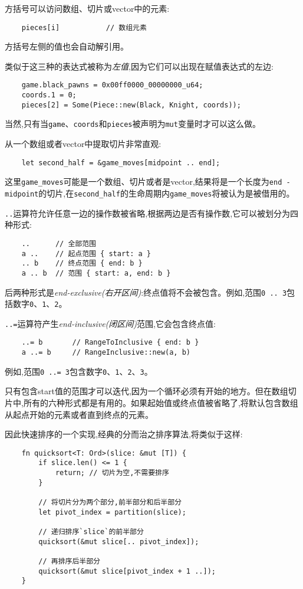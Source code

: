 方括号可以访问数组、切片或vector中的元素:
\begin{verbatim}
    pieces[i]           // 数组元素
\end{verbatim}

方括号左侧的值也会自动解引用。

类似于这三种的表达式被称为\emph{左值},因为它们可以出现在赋值表达式的左边:
\begin{verbatim}
    game.black_pawns = 0x00ff0000_00000000_u64;
    coords.1 = 0;
    pieces[2] = Some(Piece::new(Black, Knight, coords));
\end{verbatim}

当然,只有当\texttt{game}、\texttt{coords}和\texttt{pieces}被声明为\texttt{mut}变量时才可以这么做。

从一个数组或者vector中提取切片非常直观:
\begin{verbatim}
    let second_half = &game_moves[midpoint .. end];
\end{verbatim}

这里\texttt{game\_moves}可能是一个数组、切片或者是vector,结果将是一个长度为\texttt{end - midpoint}的切片,在\texttt{second\_half}的生命周期内\texttt{game\_moves}将被认为是被借用的。

\texttt{..}运算符允许任意一边的操作数被省略,根据两边是否有操作数,它可以被划分为四种形式:
\begin{verbatim}
    ..      // 全部范围
    a ..    // 起点范围 { start: a }
    .. b    // 终点范围 { end: b }
    a .. b  // 范围 { start: a, end: b }
\end{verbatim}

后两种形式是\emph{end-exclusive(右开区间)}:终点值将不会被包含。例如,范围\texttt{0 .. 3}包括数字\texttt{0}、\texttt{1}、\texttt{2}。

\texttt{..=}运算符产生\emph{end-inclusive(闭区间)}范围,它会包含终点值:
\begin{verbatim}
    ..= b       // RangeToInclusive { end: b }
    a ..= b     // RangeInclusive::new(a, b)
\end{verbatim}

例如,范围\texttt{0 ..= 3}包含数字\texttt{0}、\texttt{1}、\texttt{2}、\texttt{3}。

只有包含start值的范围才可以迭代,因为一个循环必须有开始的地方。但在数组切片中,所有的六种形式都是有用的。如果起始值或终点值被省略了,将默认包含数组从起点开始的元素或者直到终点的元素。

因此快速排序的一个实现,经典的分而治之排序算法,将类似于这样:
\begin{verbatim}
    fn quicksort<T: Ord>(slice: &mut [T]) {
        if slice.len() <= 1 {
            return; // 切片为空,不需要排序
        }

        // 将切片分为两个部分,前半部分和后半部分
        let pivot_index = partition(slice);

        // 递归排序`slice`的前半部分
        quicksort(&mut slice[.. pivot_index]);

        // 再排序后半部分
        quicksort(&mut slice[pivot_index + 1 ..]);
    }
\end{verbatim}

